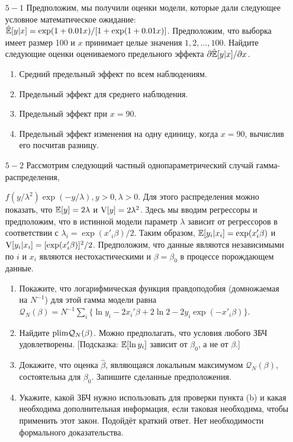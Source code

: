 \begin{enumerate}
\item [$5-1$] Предположим, мы получили оценки модели, которые дали следующее условное математическое ожидание: $\hat{\mathbb{E}}[y|x]=\exp(1+0.01x)/[1+\exp(1+0.01x)]$. Предположим, что выборка имеет размер 100 и $x$ принимает целые значения $1,2,\dots,100$. Найдите следующие оценки оцениваемого предельного эффекта $\partial \hat{\mathbb{E}}[y|x]/\partial x$.
\begin{enumerate}
\item Средний предельный эффект по всем наблюдениям.
\item Предельный эффект для среднего наблюдения.
\item Предельный эффект при $x=90$.
\item Предельный эффект  изменения на одну единицу, когда $x=90$, вычислив его посчитав разницу.
\end{enumerate}

\item [$5-2$] Рассмотрим следующий частный однопараметрический случай гамма-распределения, 

$f(y/\lambda^2)\exp(-y/\lambda),y>0,\lambda>0$. Для этого распределения можно показать, что $\mathbb{E}[y]=2\lambda$ и $\mathrm{V}[y]=2\lambda^2$. Здесь мы вводим регрессоры и предположим, что в истинной модели параметр $\lambda$ зависит от регрессоров в соответствии с $\lambda_i=\exp(x'_i\beta)/2$. Таким образом, $\mathbb{E}[y_i|x_i]=\exp(x'_i\beta)$ и $\mathrm{V}[y_i|x_i]=[\exp(x'_i\beta)]^{2}/2$. Предположим, что данные являются независимыми по $i$ и $x_i$ являются нестохастическими и $\beta=\beta_0$ в процессе порождающем данные.
\begin{enumerate}
\item Покажите, что логарифмическая функция правдоподобия (домножаемая на $N^{-1}$) для этой гамма модели равна $\mathcal{Q}_{N}(\beta)=N^{-1} \sum_i\{\ln y_i -2 x_i'\beta + 2\ln2 -2 y_i \exp(-x'_i \beta) \}$.
\item Найдите $\mathrm{plim } \mathcal{Q}_{N}(\beta)$. Можно предполагать, что условия любого ЗБЧ удовлетворены. [Подсказка: $\mathbb{E}[\ln y_i]$ зависит от $\beta_0$, а не от $\beta$.]
\item Докажите, что оценка $\hat{\beta}$, являющаяся локальным максимумом $\mathcal{Q}_{N}(\beta)$, состоятельна для $\beta_0$. Запишите сделанные предположения.
\item Укажите, какой ЗБЧ нужно использовать для проверки пункта (b) и какая необходима дополнительная информация, если таковая необходима, чтобы применить этот закон. Подойдёт краткий ответ. Нет необходимости формального доказательства.
\end{enumerate}


\end{enumerate}
